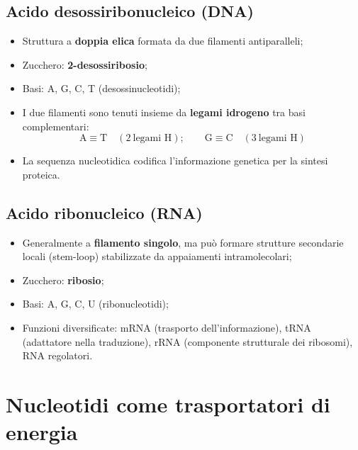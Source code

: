 \documentclass[12pt,a4paper]{report}
\begin{document}
\subsection{Acido desossiribonucleico (DNA)}
\begin{itemize}
\item Struttura a \textbf{doppia elica} formata da due filamenti antiparalleli;
\item Zucchero: \textbf{2-desossiribosio};
\item Basi: A, G, C, T (desossinucleotidi);
\item I due filamenti sono tenuti insieme da \textbf{legami idrogeno} tra basi complementari:
\[
\mathrm{A \equiv T} \quad (2\ \text{legami H}); \qquad \mathrm{G \equiv C} \quad (3\ \text{legami H})
\]
\item La sequenza nucleotidica codifica l'informazione genetica per la sintesi proteica.
\end{itemize}
\subsection{Acido ribonucleico (RNA)}
\begin{itemize}
\item Generalmente a \textbf{filamento singolo}, ma può formare strutture secondarie locali (stem-loop) stabilizzate da appaiamenti intramolecolari;
\item Zucchero: \textbf{ribosio};
\item Basi: A, G, C, U (ribonucleotidi);
\item Funzioni diversificate: mRNA (trasporto dell'informazione), tRNA (adattatore nella traduzione), rRNA (componente strutturale dei ribosomi), RNA regolatori.
\end{itemize}

\section{Nucleotidi come trasportatori di energia}
\end{document}
